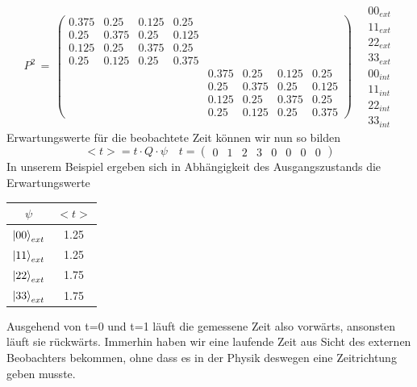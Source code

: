 \documentclass[12pt]{article}
\begin{document}
\begin{equation}
P^2\, =\,
\begin{pmatrix}
 0.375 & 0.25 & 0.125 & 0.25 &&&& \\
 0.25 & 0.375 & 0.25 & 0.125 &&&& \\ 
 0.125 & 0.25 & 0.375 & 0.25 &&&& \\
 0.25 & 0.125 & 0.25 & 0.375 &&&& \\
 &&&& 0.375 & 0.25 & 0.125 & 0.25 \\
 &&&& 0.25 & 0.375 & 0.25 & 0.125 \\
 &&&& 0.125 & 0.25 & 0.375 & 0.25 \\
 &&&& 0.25 & 0.125 & 0.25 & 0.375 
\end{pmatrix}
\quad
\begin{matrix}
00_{ext} \\ 11_{ext} \\ 22_{ext} \\ 33_{ext} \\ 00_{int} \\ 11_{int} \\ 22_{int} \\ 33_{int}
\end{matrix}
\end{equation}
Erwartungswerte für die beobachtete Zeit können wir nun so bilden
\begin{equation}
<t> = t \cdot Q \cdot \psi \quad t = \begin{pmatrix}
0&1&2&3&0&0&0&0
\end{pmatrix}
\end{equation}
In unserem Beispiel ergeben sich in Abhängigkeit des Ausgangszustands die Erwartungswerte
\begin{center}
\begin{tabular}{ |c|c| } 
 \hline
 $\psi$ & $<t>$ \\ 
 \hline
 $\ket{00}_{ext}$ & 1.25 \\ 
 $\ket{11}_{ext}$ & 1.25 \\ 
 $\ket{22}_{ext}$ & 1.75 \\ 
 $\ket{33}_{ext}$ & 1.75 \\ 
 \hline
\end{tabular}
\end{center}
Ausgehend von t=0 und t=1 läuft die gemessene Zeit also vorwärts, ansonsten läuft sie rückwärts. Immerhin haben wir eine laufende Zeit aus Sicht des externen Beobachters bekommen, ohne dass es in der Physik deswegen eine Zeitrichtung geben musste. 
\end{document}

